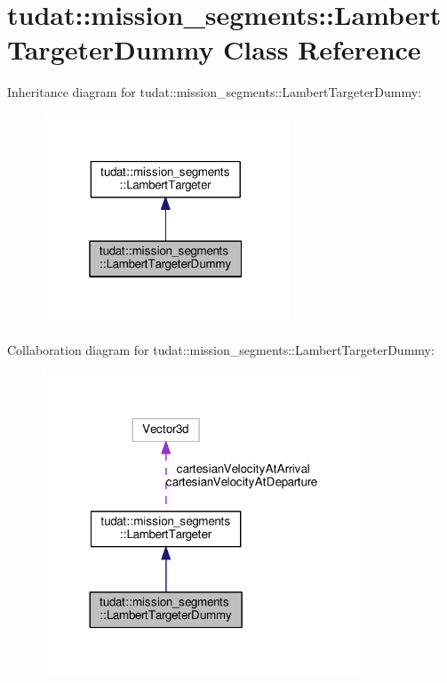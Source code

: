 \hypertarget{classtudat_1_1mission__segments_1_1LambertTargeterDummy}{}\section{tudat\+:\+:mission\+\_\+segments\+:\+:Lambert\+Targeter\+Dummy Class Reference}
\label{classtudat_1_1mission__segments_1_1LambertTargeterDummy}


Inheritance diagram for tudat\+:\+:mission\+\_\+segments\+:\+:Lambert\+Targeter\+Dummy\+:
\nopagebreak
\begin{figure}[H]
\begin{center}
\leavevmode
\includegraphics[width=208pt]{classtudat_1_1mission__segments_1_1LambertTargeterDummy__inherit__graph}
\end{center}
\end{figure}


Collaboration diagram for tudat\+:\+:mission\+\_\+segments\+:\+:Lambert\+Targeter\+Dummy\+:
\nopagebreak
\begin{figure}[H]
\begin{center}
\leavevmode
\includegraphics[width=272pt]{classtudat_1_1mission__segments_1_1LambertTargeterDummy__coll__graph}
\end{center}
\end{figure}
